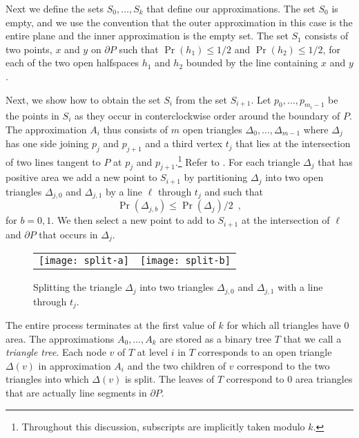 \documentclass[charterfonts,lotsofwhite]{patmorin}
\newcommand{\boundary}{\partial}
\begin{document}
 Next we define the
sets $S_0,\ldots,S_k$ that define our approximations.  The set $S_0$
is empty, and we use the convention that the outer approximation in
this case is the entire plane and the inner approximation is the empty
set. The set $S_1$ consists of two points, $x$ and $y$ on $\boundary
P$ such that $\Pr(h_1)\le 1/2$ and $\Pr(h_2)\le 1/2$, for each of the
two open halfspaces $h_1$ and $h_2$ bounded by the line containing $x$
and $y$.

Next, we show how to obtain the set $S_i$ from the set $S_{i+1}$.  Let
$p_0,\ldots,p_{m_i-1}$ be the points in $S_i$ as they occur in
conterclockwise order around the boundary of $P$.  The approximation
$A_i$ thus consists of $m$ open triangles
$\Delta_0,\ldots,\Delta_{m-1}$ where $\Delta_j$ has one side joining
$p_j$ and $p_{j+1}$ and a third vertex $t_j$ that lies at the
intersection of two lines tangent to $P$ at $p_j$ and
$p_{j+1}$.\footnote{Throughout this discussion, subscripts are
implicitly taken modulo $k$.}  Refer to . For each
triangle $\Delta_j$ that has positive area we add a new point to
$S_{i+1}$  by partitioning $\Delta_j$ into two open triangles
$\Delta_{j,0}$ and $\Delta_{j,1}$ by a line $\ell$ through $t_j$ and
such that 
\[  
     \Pr(\Delta_{j,b}) \le \Pr(\Delta_{j})/2 \enspace ,
\]
for $b=0,1$.
We then select a new point to add to $S_{i+1}$ at the intersection of
$\ell$ and $\boundary P$ that occurs in $\Delta_j$.

\begin{figure}
\begin{center}
\begin{tabular}{cc}
\texttt{[image: split-a]} & \texttt{[image: split-b]}
\end{tabular}
\end{center}
\caption{Splitting the triangle $\Delta_j$ into two triangles
$\Delta_{j,0}$ and $\Delta_{j,1}$ with a line through $t_j$.}
\end{figure}

The entire process terminates at the first value of $k$ for which all
triangles have 0 area.  The approximations $A_0,\ldots,A_k$ are stored
as a binary tree $T$ that we call a \emph{triangle tree}.  Each node
$v$ of $T$ at level $i$ in $T$ corresponds to an open triangle
$\Delta(v)$ in approximation $A_{i}$ and the two children of $v$
correspond to the two triangles into which $\Delta(v)$ is split.  The
leaves of $T$ correspond to 0 area triangles that are actually line
segments in $\boundary P$. 
\end{document}
